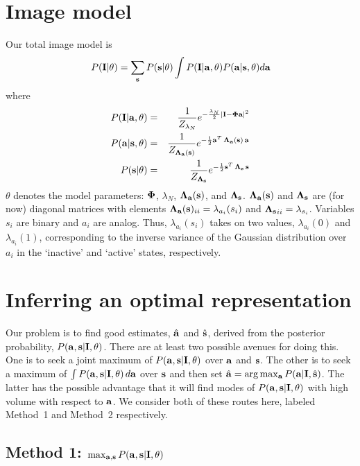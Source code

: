 \documentclass[12pt]{article}
\newcommand{\params}{\theta}
\newcommand{\ba}{{\bf a}}
\newcommand{\bah}{\hat{\bf a}}
\newcommand{\bs}{{\bf s}}
\newcommand{\bsh}{\hat{\bf s}}
\newcommand{\bI}{{\bf I}}
\newcommand{\bPhi}{{\bf \Phi}}
\newcommand{\bLambdas}{{\bf \Lambda_s}}
\newcommand{\bLambdaa}{{\bf \Lambda_a}}
\begin{document}
\section{Image model}

Our total image model is
\begin{equation}
P(\bI|\params) = \sum_{\bs} P(\bs|\params) 
                 \int P(\bI|\ba,\params) P(\ba|\bs,\params) d\ba
\end{equation}
where
\begin{eqnarray}
P(\bI|\ba,\params) & = & \frac{1}{Z_{\lambda_N}} 
  e^{-\frac{\lambda_N}{2}|\bI-\bPhi\ba|^2} \\
P(\ba|\bs,\params) & = & \frac{1}{Z_{\bLambdaa(\bs)}}
  e^{-\frac{1}{2} \ba^T \, \bLambdaa(\bs)\, \ba} \\
P(\bs|\params) & = & \frac{1}{Z_{\bLambdas}}
  e^{-\frac{1}{2} \bs^T \, \bLambdas\, \bs}
\end{eqnarray}
$\theta$ denotes the model parameters: $\bPhi$, $\lambda_N$,
$\bLambdaa(\bs)$, and $\bLambdas$.  $\bLambdaa(\bs)$ and $\bLambdas$
are (for now) diagonal matrices with elements
$\bLambdaa(\bs)_{ii}=\lambda_{a_i}(s_i)$ and
$\bLambdas_{ii}=\lambda_{s_i}$.  Variables $s_i$ are binary and $a_i$
are analog.  Thus, $\lambda_{a_i}(s_i)$ takes on two values,
$\lambda_{a_i}(0)$ and $\lambda_{a_i}(1)$, corresponding to the
inverse variance of the Gaussian distribution over $a_i$ in the
`inactive' and `active' states, respectively.


\section{Inferring an optimal representation}

Our problem is to find good estimates, $\bah$ and $\bsh$, derived from
the posterior probability, $P(\ba,\bs|\bI,\params)$.  There are at
least two possible avenues for doing this.  One is to seek a joint
maximum of $P(\ba,\bs|\bI,\params)$ over $\ba$ and $\bs$.  The other
is to seek a maximum of $\int P(\ba,\bs|\bI,\params)\, d\ba$ over $\bs$
and then set $\bah=\arg\max_{\ba} P(\ba|\bI,\bsh)$.  The latter has
the possible advantage that it will find modes of
$P(\ba,\bs|\bI,\params)$ with high volume with respect to $\ba$.  We
consider both of these routes here, labeled Method~1 and Method~2
respectively.

\subsection{Method 1: $\max_{\ba,\bs} P(\ba,\bs|\bI,\params)$}
\end{document}
